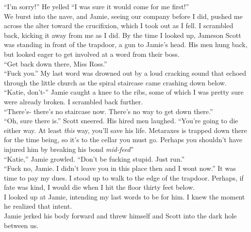 \documentclass[a5paper]{scrartcl}
\begin{document}
\enquote{I'm sorry!} He yelled \enquote{I was sure it would come for me first!}\\


We burst into the nave, and Jamie, seeing our company before I did, pushed me across the alter toward the crucifixion, which I took out as I fell. I scrambled back, kicking it away from me as I did. By the time I looked up, Jameson Scott was standing in front of the trapdoor, a gun to Jamie's head. His men hung back, but looked eager to get involved at a word from their boss. \\


\enquote{Get back down there, Miss Ross.} \\


\enquote{Fuck you.} My last word was drowned out by a loud cracking sound that echoed  through the little church as the spiral staircase came crashing down below. \\


\enquote{Katie, don't-} Jamie caught a knee to the ribs, some of which I was pretty sure were already broken. I scrambled back further. \\


\enquote{There's- there's no staircase now. There's no way to get down there.}\\


\enquote{Oh, sure there is.} Scott sneered. His hired men laughed. \enquote{You're going to die either way. At least \textit{this}
 way, you'll save his life. Metaraxes is trapped down there for the time being, so it's to the cellar you must go. Perhaps you shouldn't have injured him by breaking his bond \textit{mid-feed}}\\


\enquote{Katie,} Jamie growled. \enquote{Don't be fucking stupid. Just run.}\\


\enquote{Fuck no, Jamie. I didn't leave you in this place then and I wont now.} It was time to pay my dues. I stood up to walk to the edge of the trapdoor. Perhaps, if fate was kind, I would die when I hit the floor thirty feet below. \\


I looked up at Jamie, intending my last words to be for him. I knew the moment he realized that intent. \\


Jamie jerked his body forward and threw himself and Scott into the dark hole between us.\\
\end{document}
